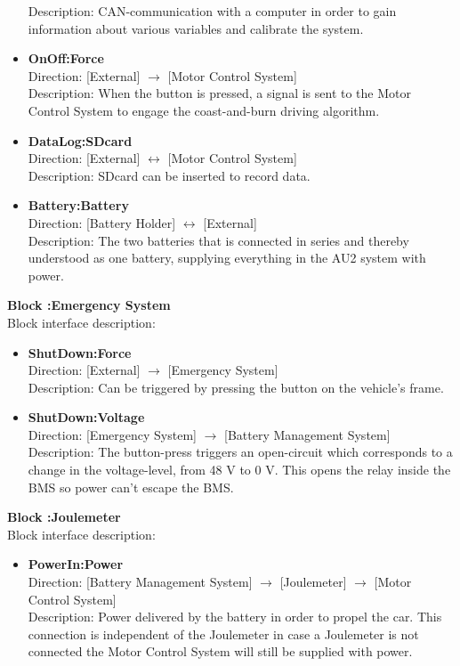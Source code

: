 \begin{itemize}
	Description: CAN-communication with a computer in order to gain information about various variables and calibrate the system.
	\item \textbf{OnOff:Force}\\
	Direction: [External] $\rightarrow$ [Motor Control System]\\
	Description: When the button is pressed, a signal is sent to the Motor Control System to engage the coast-and-burn driving algorithm. 
	\item \textbf{DataLog:SDcard}\\
	Direction: [External] $\leftrightarrow$ [Motor Control System]\\
	Description: SDcard can be inserted to record data.
	\item \textbf{Battery:Battery}\\
	Direction: [Battery Holder] $\leftrightarrow$ [External]\\
	Description: The two batteries that is connected in series and thereby understood as one battery, supplying everything in the AU2 system with power.
\end{itemize}

\textbf{Block :Emergency System}\\
Block interface description:
\begin{itemize}
	\item \textbf{ShutDown:Force}\\
	Direction: [External] $\rightarrow$ [Emergency System]\\
	Description: Can be triggered by pressing the button on the vehicle's frame.
	\item \textbf{ShutDown:Voltage}\\
	Direction: [Emergency System] $\rightarrow$ [Battery Management System]\\
	Description: The button-press triggers an open-circuit which corresponds to a change in the voltage-level, from 48 V to 0 V. This opens the relay inside the BMS so power can't escape the BMS.
\end{itemize}

\textbf{Block :Joulemeter}\\
Block interface description:
\begin{itemize}
	\item \textbf{PowerIn:Power}\\
	Direction: [Battery Management System] $\rightarrow$ [Joulemeter] $\rightarrow$ [Motor Control System]\\
	Description: Power delivered by the battery in order to propel the car. This connection is independent of the Joulemeter in case a Joulemeter is not connected the Motor Control System will still be supplied with power.
\end{itemize}

